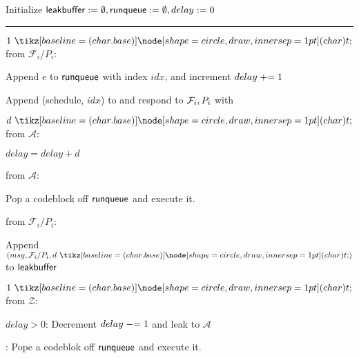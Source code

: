 \begin{bbox}[title={\textbf{Wrapper} $\mathcal{W}_{\msf{async}}$} ]

Initialize ${\mathsf {leakbuffer}} := \emptyset, {\mathsf {runqueue}} := \emptyset, delay := 0$

\vspace{2mm} \hrule \vspace{2mm}

\OnInput {} $1 \token$ from $\mathcal{F}_i$/$P_i$:

	\begin{ritemize}

	\item Append $e$ to ${\mathsf {runqueue}}$ with index $idx$, and increment $delay \mathrel{+}= 1$


	\item Append (schedule, $idx$) to  and respond to $\mathcal{F}_i,P_i$ with 

	\end{ritemize}

\OnInput {} $d \token$ from $\mathcal{A}$:

	\begin{ritemize}
	\item $delay = delay + d$
	\end{ritemize}

\OnInput {} from $\mathcal{A}$:
	\begin{ritemize}	
	\item Pop a codeblock off ${\mathsf {runqueue}}$  and execute it.
	\end{ritemize}

\OnInput {} from $\mathcal{F}_i/P_i$:
	\begin{ritemize}
	\item Append $(msg, \mathcal{F}_i/P_i, d \token)$ to ${\mathsf {leakbuffer}}$
	\end{ritemize}

\OnInput {} $1 \token$ from $\mathcal{Z}$:
	\begin{ritemize}
	\item \If $delay > 0$:
		Decrement $delay \mathrel{-}= 1$ and leak  to $\mathcal{A}$
	\item \Else: 
		Pope a codeblok off ${\mathsf {runqueue}}$ and execute it.
	\end{ritemize}


\end{bbox}
